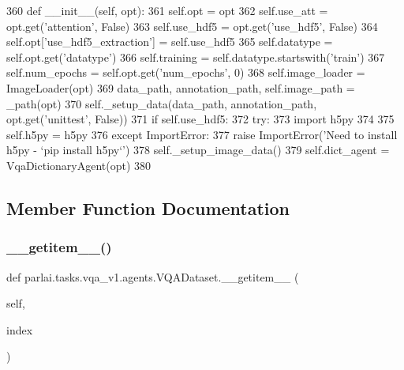 \begin{DoxyCode}
360     \textcolor{keyword}{def }\_\_init\_\_(self, opt):
361         self.opt = opt
362         self.use\_att = opt.get(\textcolor{stringliteral}{'attention'}, \textcolor{keyword}{False})
363         self.use\_hdf5 = opt.get(\textcolor{stringliteral}{'use\_hdf5'}, \textcolor{keyword}{False})
364         self.opt[\textcolor{stringliteral}{'use\_hdf5\_extraction'}] = self.use\_hdf5
365         self.datatype = self.opt.get(\textcolor{stringliteral}{'datatype'})
366         self.training = self.datatype.startswith(\textcolor{stringliteral}{'train'})
367         self.num\_epochs = self.opt.get(\textcolor{stringliteral}{'num\_epochs'}, 0)
368         self.image\_loader = ImageLoader(opt)
369         data\_path, annotation\_path, self.image\_path = \_path(opt)
370         self.\_setup\_data(data\_path, annotation\_path, opt.get(\textcolor{stringliteral}{'unittest'}, \textcolor{keyword}{False}))
371         \textcolor{keywordflow}{if} self.use\_hdf5:
372             \textcolor{keywordflow}{try}:
373                 \textcolor{keyword}{import} h5py
374 
375                 self.h5py = h5py
376             \textcolor{keywordflow}{except} ImportError:
377                 \textcolor{keywordflow}{raise} ImportError(\textcolor{stringliteral}{'Need to install h5py - `pip install h5py`'})
378             self.\_setup\_image\_data()
379         self.dict\_agent = VqaDictionaryAgent(opt)
380 
\end{DoxyCode}


\subsection{Member Function Documentation}
\mbox{\label{classparlai_1_1tasks_1_1vqa__v1_1_1agents_1_1VQADataset_a2212cb2961827b893bc0d3354c305f66}} 
\subsubsection{\texorpdfstring{\+\_\+\+\_\+getitem\+\_\+\+\_\+()}{\_\_getitem\_\_()}}
{\footnotesize\ttfamily def parlai.\+tasks.\+vqa\+\_\+v1.\+agents.\+V\+Q\+A\+Dataset.\+\_\+\+\_\+getitem\+\_\+\+\_\+ (\begin{DoxyParamCaption}\item[{}]{self,  }\item[{}]{index }\end{DoxyParamCaption})}



